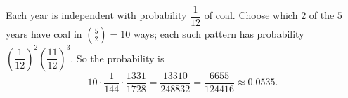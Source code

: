 Each year is independent with probability $\dfrac{1}{12}$ of coal. Choose which $2$ of the $5$ years have coal in $\binom52=10$ ways; each such pattern has probability $\left(\dfrac{1}{12}\right)^2\left(\dfrac{11}{12}\right)^3$. So the probability is
\[
10\cdot\dfrac{1}{144}\cdot\dfrac{1331}{1728}=\dfrac{13310}{248832}=\boxed{\dfrac{6655}{124416}}\approx0.0535 .
\]
